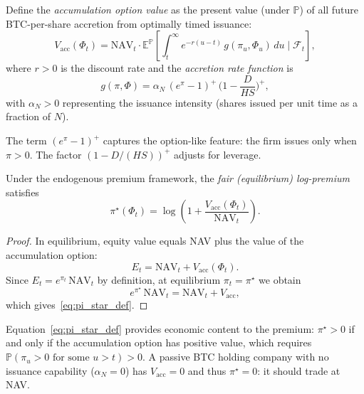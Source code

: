 \begin{definition}
  \label{def:vacc}
  Define the \emph{accumulation option value} as the present value (under
  $\mathbb{P}$) of all future BTC-per-share accretion from optimally timed
  issuance:
  \begin{equation}
    \label{eq:vacc_def}
    V_{\mathrm{acc}}(\Phi_t)
    = \mathrm{NAV}_t \cdot
      \mathbb{E}^{\mathbb{P}}\!\left[
        \int_t^\infty e^{-r(u-t)}\,
        g(\pi_u,\Phi_u)\,du
        \;\Big|\;\mathcal{F}_t
      \right],
  \end{equation}
  where $r > 0$ is the discount rate and the \emph{accretion rate function}
  is
  \begin{equation}
    \label{eq:accretion_rate}
    g(\pi,\Phi)
    = \alpha_N\,(e^\pi - 1)^+\,\biggl(1 - \frac{D}{HS}\biggr)^+,
  \end{equation}
  with $\alpha_N > 0$ representing the issuance intensity (shares issued per
  unit time as a fraction of $N$).
\end{definition}

The term $(e^\pi - 1)^+$ captures the option-like feature: the firm issues
only when $\pi > 0$.  The factor $(1 - D/(HS))^+$ adjusts for leverage.

\begin{proposition}
  \label{prop:fair_premium}
  Under the endogenous premium framework, the \emph{fair (equilibrium)
  log-premium} satisfies
  \begin{equation}
    \label{eq:pi_star_def}
    \boxed{
      \pi^\star(\Phi_t)
      = \log\!\left(1 + \frac{V_{\mathrm{acc}}(\Phi_t)}{\mathrm{NAV}_t}\right).
    }
  \end{equation}
\end{proposition}

\begin{proof}
  In equilibrium, equity value equals NAV plus the value of the accumulation
  option:
  \[
    E_t = \mathrm{NAV}_t + V_{\mathrm{acc}}(\Phi_t).
  \]
  Since $E_t = e^{\pi_t}\,\mathrm{NAV}_t$ by definition, at equilibrium
  $\pi_t = \pi^\star$ we obtain
  \[
    e^{\pi^\star}\,\mathrm{NAV}_t = \mathrm{NAV}_t + V_{\mathrm{acc}},
  \]
  which gives~\eqref{eq:pi_star_def}.
\end{proof}

\begin{remark}
  Equation~\eqref{eq:pi_star_def} provides economic content to the premium:
  $\pi^\star > 0$ if and only if the accumulation option has positive value,
  which requires $\mathbb{P}(\pi_u > 0 \text{ for some } u > t) > 0$.
  A passive BTC holding company with no issuance capability ($\alpha_N = 0$)
  has $V_{\mathrm{acc}} = 0$ and thus $\pi^\star = 0$: it should trade at NAV.
\end{remark}

